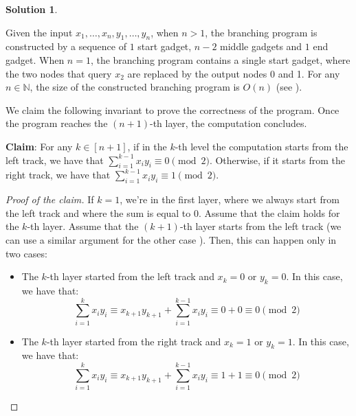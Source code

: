 \documentclass[12pt,a4paper]{report}
\theoremstyle{definition}
\newtheorem{solution}{Solution}
\begin{document}
\begin{solution}
\begin{enumerate}
            Given the input $x_1, \ldots, x_n, y_1, \ldots, y_n$, when $n > 1$, the branching program is constructed by a sequence of $1$ start gadget, $n-2$ middle gadgets and $1$ end gadget. When $n = 1$, the branching program contains a single start gadget, where the two nodes that query $x_{2}$ are replaced by the output nodes 0 and 1. For any $n \in \mathbb{N}$, the size of the constructed branching program is $O(n)$ (see ).
            
            We claim the following invariant to prove the correctness of the program. Once the program reaches the $(n+1)$-th layer, the computation concludes.

            \textbf{Claim}: For any $k \in [n+1]$, if in the $k$-th level the computation starts from the left track, we have that $\sum_{i = 1}^{k-1} x_i y_i \equiv 0 \pmod 2$. Otherwise, if it starts from the right track, we have that $\sum_{i = 1}^{k-1} x_i y_i \equiv 1 \pmod 2$.

            \begin{proof}[Proof of the claim]
                If $k = 1$, we're in the first layer, where we always start from the left track and where the sum is equal to 0. Assume that the claim holds for the $k$-th layer. Assume that the $(k+1)$-th layer starts from the left track (we can use a similar argument for the other case ). Then, this can happen only in two cases:
                \begin{itemize}
                    \item The $k$-th layer started from the left track and $x_k = 0$ or $y_k = 0$. In this case, we have that:
                    \[\sum_{i = 1}^k x_iy_i \equiv x_{k+1}y_{k+1} + \sum_{i = 1}^{k-1} x_iy_i \equiv 0+0 \equiv 0 \pmod 2\]
                    \item The $k$-th layer started from the right track and $x_k = 1$ or $y_k = 1$. In this case, we have that:
                    \[\sum_{i = 1}^k x_iy_i \equiv x_{k+1}y_{k+1} + \sum_{i = 1}^{k-1} x_iy_i \equiv 1+1 \equiv 0 \pmod 2\]
                \end{itemize}
            \end{proof}

            \begin{figure}[H]
                \centering
\end{figure}
\end{enumerate}
\end{solution}
\end{document}
